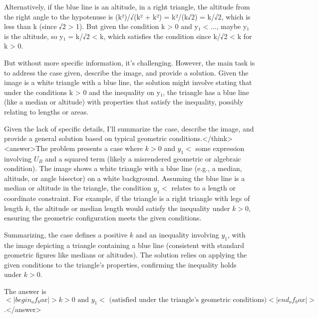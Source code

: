 Alternatively, if the blue line is an altitude, in a right triangle, the altitude from the right angle to the hypotenuse is (k²)/√(k² + k²) = k²/(k√2) = k/√2, which is less than k (since √2 > 1). But given the condition k > 0 and y₁ < ..., maybe y₁ is the altitude, so y₁ = k/√2 < k, which satisfies the condition since k/√2 < k for k > 0.

But without more specific information, it's challenging. However, the main task is to address the case given, describe the image, and provide a solution. Given the image is a white triangle with a blue line, the solution might involve stating that under the conditions k > 0 and the inequality on y₁, the triangle has a blue line (like a median or altitude) with properties that satisfy the inequality, possibly relating to lengths or areas.

Given the lack of specific details, I'll summarize the case, describe the image, and provide a general solution based on typical geometric conditions.</think><answer>The problem presents a case where \( k > 0 \) and \( y_1 < \) some expression involving \( U_B \) and a squared term (likely a misrendered geometric or algebraic condition). The image shows a white triangle with a blue line (e.g., a median, altitude, or angle bisector) on a white background. Assuming the blue line is a median or altitude in the triangle, the condition \( y_1 < \) relates to a length or coordinate constraint. For example, if the triangle is a right triangle with legs of length \( k \), the altitude or median length would satisfy the inequality under \( k > 0 \), ensuring the geometric configuration meets the given conditions.  

Summarizing, the case defines a positive \( k \) and an inequality involving \( y_1 \), with the image depicting a triangle containing a blue line (consistent with standard geometric figures like medians or altitudes). The solution relies on applying the given conditions to the triangle's properties, confirming the inequality holds under \( k > 0 \).  

The answer is \(<|begin_of_box|>k > 0 \text{ and } y_1 < \text{ (satisfied under the triangle's geometric conditions)}<|end_of_box|>\).</answer>